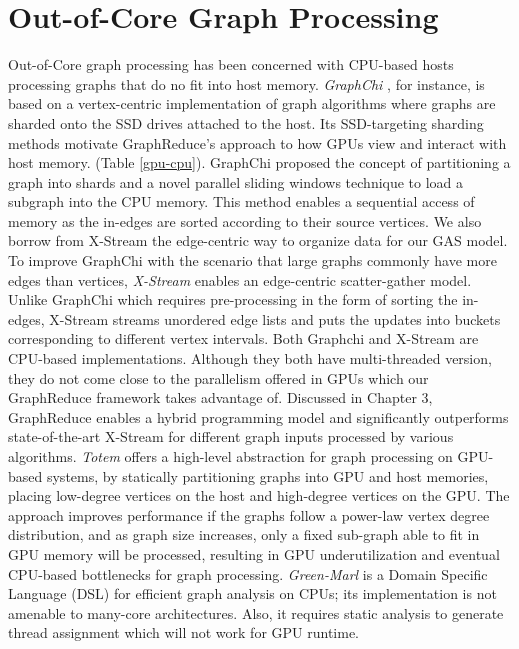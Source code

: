 \section{Out-of-Core Graph Processing} Out-of-Core graph processing has been concerned with CPU-based hosts processing graphs 
that do no fit into host memory. \textit{GraphChi} \cite{chi}, for instance, is based on a vertex-centric implementation of 
graph algorithms where graphs are sharded onto the SSD drives attached to the host. Its SSD-targeting sharding methods motivate 
GraphReduce's approach to how GPUs view and interact with host memory. (Table \ref{gpu-cpu}). 
GraphChi proposed the concept of partitioning a graph into shards and a novel parallel sliding windows technique to load a subgraph into the CPU memory. This method enables a sequential access of memory as the in-edges are sorted according to their source vertices.  
We also borrow from X-Stream \cite{xstream} the edge-centric way to organize data for our GAS model.
To improve GraphChi with the scenario that large graphs commonly have more edges than vertices, \textit{X-Stream} \cite{xstream} enables an edge-centric scatter-gather model. Unlike GraphChi which requires pre-processing in the form of sorting the in-edges, X-Stream streams unordered edge lists and puts the updates into buckets corresponding to different vertex intervals. Both Graphchi and X-Stream are CPU-based implementations. Although they both have multi-threaded version, they do not come close to the parallelism offered in GPUs which our GraphReduce framework takes advantage of. 
Discussed in Chapter 3, GraphReduce enables a hybrid programming model and significantly outperforms state-of-the-art X-Stream for different graph inputs processed by various algorithms. 
\textit{Totem} \cite{totem} offers a high-level abstraction for graph processing on GPU-based systems, by statically partitioning graphs 
into GPU and host memories, placing low-degree vertices on the host and high-degree vertices on the GPU. 
The approach improves performance if the graphs follow a power-law vertex degree distribution, and as graph size increases, only
a fixed sub-graph able to fit in GPU memory will be processed, resulting in GPU underutilization and eventual CPU-based bottlenecks
for graph processing. \textit{Green-Marl} \cite{green} is a Domain Specific Language (DSL) 
for efficient graph analysis on CPUs; its implementation is not amenable to many-core architectures. Also, it requires static analysis to generate thread assignment which will not work for GPU runtime. 



